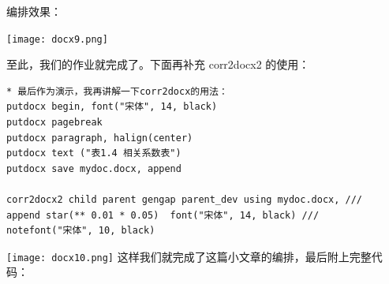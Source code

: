 \documentclass[cn,fancy,blue,11pt]{elegantbook}
\begin{document}
编排效果：

\noindent\texttt{[image: docx9.png]}

至此，我们的作业就完成了。下面再补充 corr2docx2 的使用：

\begin{lstlisting}
* 最后作为演示，我再讲解一下corr2docx的用法：
putdocx begin, font("宋体", 14, black)
putdocx pagebreak
putdocx paragraph, halign(center)
putdocx text ("表1.4 相关系数表")
putdocx save mydoc.docx, append

corr2docx2 child parent gengap parent_dev using mydoc.docx, ///
append star(** 0.01 * 0.05)  font("宋体", 14, black) ///
notefont("宋体", 10, black)
\end{lstlisting}

\noindent\texttt{[image: docx10.png]}
这样我们就完成了这篇小文章的编排，最后附上完整代码：
\end{document}
